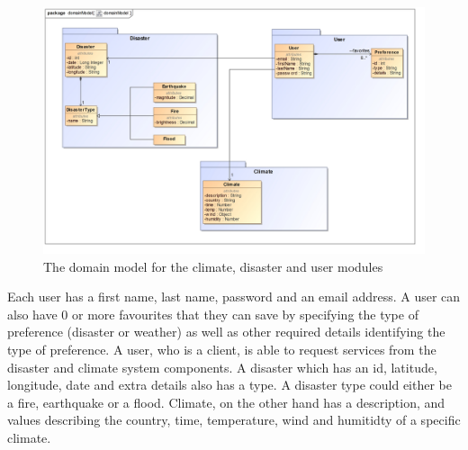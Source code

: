 \begin{figure}[H]
	\centering
	\includegraphics[scale=0.17]{../images/funcReq/domainModel.jpg}
	\caption{The domain model for the climate, disaster and user modules \label{overflow}}
\end{figure} Each user has a first name, last name, password and an email address. A user can also have 0 or more favourites that they can save by specifying the type of preference (disaster or weather) as well as other required details identifying the type of preference. A user, who is a client, is able to request services from the disaster and climate system components. A disaster which has an id, latitude, longitude, date and extra details also has a type. A disaster type could either be a fire, earthquake or a flood. Climate, on the other hand has a description, and values describing the country, time, temperature, wind and humitidty of a specific climate.